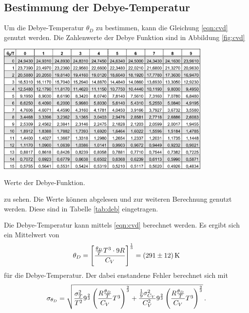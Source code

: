 \subsection{Bestimmung der Debye-Temperatur}
Um die Debye-Temperatur $\theta_D$ zu bestimmen, kann die Gleichung \eqref{eqn:cvd} genutzt werden. Die Zahlenwerte der Debye Funktion sind in Abbildung \ref{fig:cvd}
\begin{table}
	\centering
	\includegraphics[width=0.8\textwidth]{graphics/cvd.png}
	\caption{Werte der Debye-Funktion.}
	\label{fig:cvd}
\end{table}
zu sehen.
Die Werte können abgelesen und zur weiteren Berechnung genutzt werden.
Diese sind in Tabelle \ref{tab:deb} eingetragen.

Die Debye-Temperatur kann mittels \eqref{eqn:cvd} berechnet werden.
Es ergibt sich ein Mittelwert von
\begin{equation*}
	\theta_D = \left[\frac{{\frac{\theta_D}{T}}T^3\cdot9R}{C_V}\right]^{\frac{1}{3}} = \SI{291\pm12}{\kelvin}
\end{equation*}
für die Debye-Temperatur.
Der dabei enstandene Fehler berechnet sich mit
\begin{equation*}
	\sigma_{\theta_D} = \sqrt{\frac{\sigma_{T}^{2}}{T^{2}} 9^{\frac{2}{3}} \left(\frac{R {\frac{\theta_D}{T}}}{C_{V}} T^{3}\right)^{\frac{2}{3}} + \frac{\frac{1}{9} \sigma_{C_{V}}^{2}}{C_{V}^{2}} 9^{\frac{2}{3}} \left(\frac{R {\frac{\theta_D}{T}}}{C_{V}} T^{3}\right)^{\frac{2}{3}}}\,\text.
\end{equation*}

